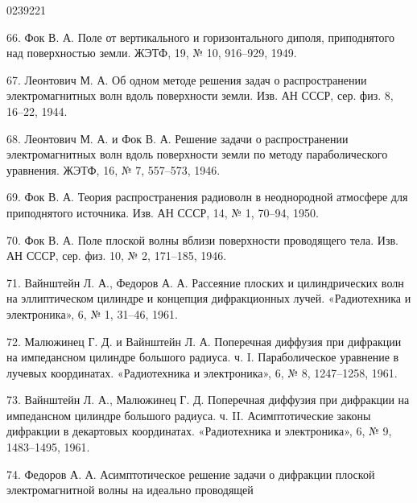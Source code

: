 \begin{scanpage}{0239}{221}
{66. Фок В. А. Поле от вертикального и горизонтального диполя, приподнятого над поверхностью земли. ЖЭТФ, 19, № 10, 916--929, 1949.\par
67. Леонтович М. А. Об одном методе решения задач о распространении электромагнитных волн вдоль поверхности земли. Изв. АН СССР, сер. физ. 8, 16--22, 1944.\par
68. Леонтович М. А. и Фок В. А. Решение задачи о распространении электромагнитных волн вдоль поверхности земли по методу параболического уравнения. ЖЭТФ, 16, № 7, 557--573, 1946.\par
69. Фок В. А. Теория распространения радиоволн в неоднородной атмосфере для приподнятого источника. Изв. АН СССР, 14, № 1, 70--94, 1950.\par
70. Фок В. А. Поле плоской волны вблизи поверхности проводящего тела. Изв. АН СССР, сер. физ. 10, № 2, 171--185, 1946.\par
71. Вайнштейн Л. А., Федоров А. А. Рассеяние плоских и цилиндрических волн на эллиптическом цилиндре и концепция дифракционных лучей. «Радиотехника и электроника», 6, № 1, 31--46, 1961.\par
72. Малюжинец Г. Д. и Вайнштейн Л. А. Поперечная диффузия при дифракции на импедансном цилиндре большого радиуса. ч. I. Параболическое уравнение в лучевых координатах. «Радиотехника и электроника», 6, № 8, 1247--1258, 1961.\par
73. Вайнштейн Л. А., Малюжинец Г. Д. Поперечная диффузия при дифракции на импедансном цилиндре большого радиуса. ч. II. Асимптотические законы дифракции в декартовых координатах. «Радиотехника и электроника», 6, № 9, 1483--1495, 1961.\par
74. Федоров А. А. Асимптотическое решение задачи о дифракции плоской электромагнитной волны на идеально проводящей\par}
\end{scanpage}
